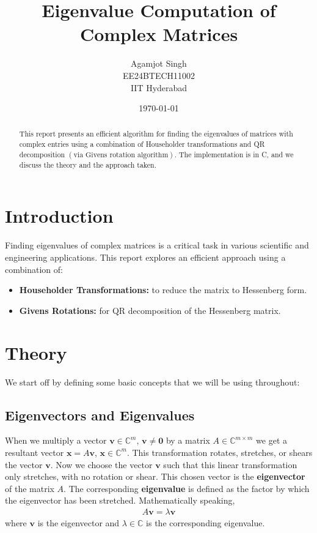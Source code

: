 \documentclass[12pt]{article}
\title{\textbf{Eigenvalue Computation of Complex Matrices}}
\author{Agamjot Singh\\EE24BTECH11002\\IIT Hyderabad}
\date{\today}
\numberwithin{equation}{section}
\newcommand{\vecb}[1]{\mathbf{#1}}
\newcommand{\brak}[1]{\ensuremath{\left(#1\right)}}
\newcommand{\defmat}[2]{#1\in\mathbb{C}^{#2\times#2}}
\newcommand{\defvec}[2]{\vecb{#1}\in\mathbb{C}^{#2}}
\begin{document}
\maketitle

\begin{abstract}
This report presents an efficient algorithm for finding the eigenvalues of matrices with complex entries using a combination of Householder transformations and QR decomposition \brak{\text{via Givens rotation algorithm}}. The implementation is in C, and we discuss the theory and the approach taken.
\end{abstract}

\section{Introduction}
Finding eigenvalues of complex matrices is a critical task in various scientific and engineering applications. This report explores an efficient approach using a combination of:
\begin{itemize}
    \item \textbf{Householder Transformations:} to reduce the matrix to Hessenberg form.
    \item \textbf{Givens Rotations:} for QR decomposition of the Hessenberg matrix.
\end{itemize}

\section{Theory}
We start off by defining some basic concepts that we will be using throughout:
\subsection{Eigenvectors and Eigenvalues}
When we multiply a vector $\defvec{v}{m}$, $\vecb{v} \neq \vecb{0}$ by a matrix $\defmat{A}{m}$ we get a resultant vector $\vecb{x} = A\vecb{v}$, $\defvec{x}{m}$. This transformation rotates, stretches, or shears the vector $\vecb{v}$. Now we choose the vector $\vecb{v}$ such that this linear transformation only stretches, with no rotation or shear.
This chosen vector is the \textbf{eigenvector} of the matrix $A$. The corresponding \textbf{eigenvalue} is defined as the factor by which the eigenvector has been stretched.
\newline
Mathematically speaking,
\begin{align}
\label{eigen:1}
    A\vecb{v} = \lambda\vecb{v}
\end{align}
where $\vecb{v}$ is the eigenvector and $\lambda \in \mathbb{C}$ is the corresponding eigenvalue.
\newline
\end{document}
